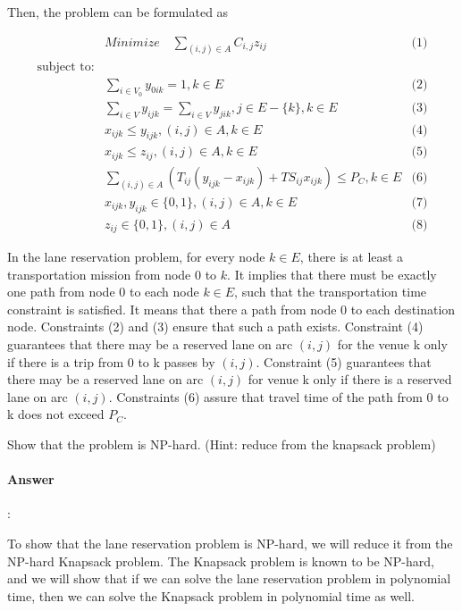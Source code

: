 \documentclass{article}
\begin{document}
Then, the problem can be formulated as

\begin{equation*}
  \begin{aligned}
    &Minimize \quad  \sum_{(i,j)\in A}C_{i,j}z_{ij} &\text{(1)} \\
    \text{subject to:}\\
    &\sum_{i \in V_0} y_{0ik} = 1, k \in E &\text{(2)}\\
    &\sum_{i \in V} y_{ijk} = \sum_{i \in V} y_{jik}, j \in E - \{k\}, k \in E &\text{(3)}\\
    &x_{ijk} \leq y_{ijk}, (i,j) \in A, k \in E &\text{(4)}\\
    &x_{ijk} \leq z_{ij}, (i,j) \in A, k \in E &\text{(5)}\\
    &\sum_{(i, j) \in A}(T_{ij}(y_{ijk}-x_{ijk}) + TS_{ij}x_{ijk}) \leq P_C, k \in E &\text{(6)}\\
    &x_{ijk}, y_{ijk} \in \{0, 1\}, (i,j) \in A, k \in E &\text{(7)}\\
    &z_{ij} \in \{0, 1\}, (i,j) \in A &\text{(8)}
  \end{aligned}
\end{equation*}

In the lane reservation problem, for every node $k \in E$, there is at least a transportation mission from node $0$ to $k$. It implies that there must be exactly one path from node $0$ to each node $k \in E$, such that the transportation time constraint is satisfied. It means that there a path from node $0$ to each destination node. Constraints (2) and (3) ensure that such a path exists. Constraint (4) guarantees that there may be a reserved lane on arc $(i, j)$ for the venue k only if there is a trip from 0 to k passes by $(i, j)$. Constraint (5) guarantees that there may be a reserved lane on arc $(i, j)$ for venue k only if there is a reserved lane on arc $(i, j)$. Constraints (6) assure that travel time of the path from 0 to k does not exceed $P_C$.

Show that the problem is NP-hard. (Hint: reduce from the knapsack problem)


\paragraph{Answer}:


To show that the lane reservation problem is NP-hard, we will reduce it from the NP-hard Knapsack problem. The Knapsack problem is known to be NP-hard, and we will show that if we can solve the lane reservation problem in polynomial time, then we can solve the Knapsack problem in polynomial time as well.
\end{document}
